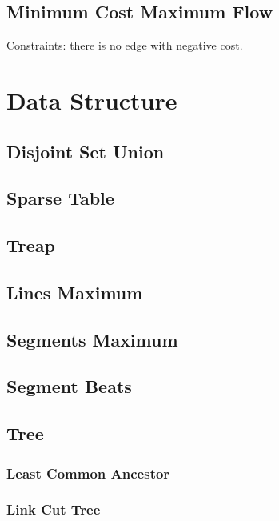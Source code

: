 \documentclass{article}
\begin{document}
\begin{multicols}{2}
    \subsection{Minimum Cost Maximum Flow}
    Constraints: there is no edge with negative cost.
    

    \section{Data Structure}
    \subsection{Disjoint Set Union}
    
    \subsection{Sparse Table}
    
    \subsection{Treap}
    
    \subsection{Lines Maximum}
    
    \subsection{Segments Maximum}
    
    \subsection{Segment Beats}
    
    \subsection{Tree}
    \subsubsection{Least Common Ancestor}
    
    \subsubsection{Link Cut Tree}
    



\end{multicols}
\end{document}
